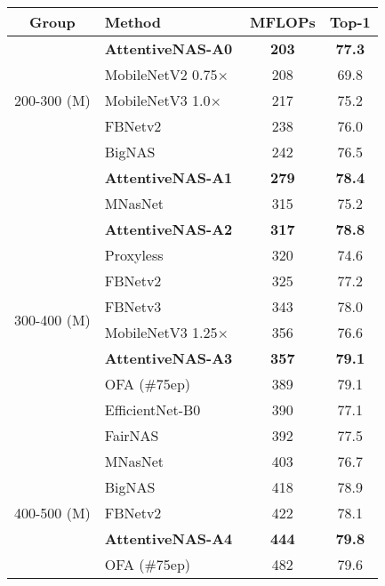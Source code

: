 \documentclass[final]{cvpr}
\theoremstyle{definition}
\begin{document}
\begin{table}[ht]
    \centering
    \setlength{\tabcolsep}{1pt}
    \begin{tabular}{clcc}
        \hline 
        Group & Method & MFLOPs & Top-1  \\
        \hline 
        \multirow{5}{6em}{200-300 (M) } 
        & \textbf{AttentiveNAS-A0}  & \textbf{203} & \textbf{77.3} \\
        & MobileNetV2 {\scriptsize 0.75$\times$}~\cite{sandler2018mobilenetv2} & 208 & 69.8 \\
        & MobileNetV3 {\scriptsize 1.0$\times$}~\cite{howard2019searching} & 217 & 75.2 \\
        & FBNetv2~\cite{wan2020fbnetv2} & 238 & 76.0 \\
        & BigNAS~\cite{yu2020bignas} & 242 & 76.5 \\
        & \textbf{AttentiveNAS-A1}   & \textbf{279} & \textbf{78.4} \\ \hline 
         \multirow{10}{6em}{300-400 (M) }
         & MNasNet~\cite{tan2019mnasnet} & 315 & 75.2 \\
        & \textbf{AttentiveNAS-A2} & \textbf{317} & \textbf{78.8}\\
        & Proxyless~\cite{cai2018proxylessnas} & 320 & 74.6 \\
        & FBNetv2~\cite{wan2020fbnetv2} & 325 & 77.2 \\ 
        & FBNetv3~\cite{dai2020fbnetv3} & 343 & 78.0 \\
        & MobileNetV3 {\scriptsize 1.25$\times$}~\cite{howard2019searching} & 356 & 76.6 \\
        & \textbf{AttentiveNAS-A3} & \textbf{357} & \textbf{79.1} \\  
        & OFA (\#75ep)~\cite{cai2019once} & 389 & 79.1 \\
        & EfficientNet-B0~\cite{tan2019efficientnet} & 390 & 77.1 \\ 
        & FairNAS~\cite{chu2019fairnas} & 392 & 77.5 \\ \hline 
        \multirow{7}{6em}{400-500 (M) }
        & MNasNet~\cite{tan2019mnasnet} & 403 & 76.7 \\
& BigNAS~\cite{yu2020bignas} & 418  &  78.9 \\
        & FBNetv2~\cite{wan2020fbnetv2} &  422 & 78.1\\ 
        & \textbf{AttentiveNAS-A4}  & \textbf{444} & \textbf{79.8} \\
        & OFA (\#75ep)~\cite{cai2019once} & 482 & 79.6 \\

\end{tabular}
\end{table}
\end{document}

